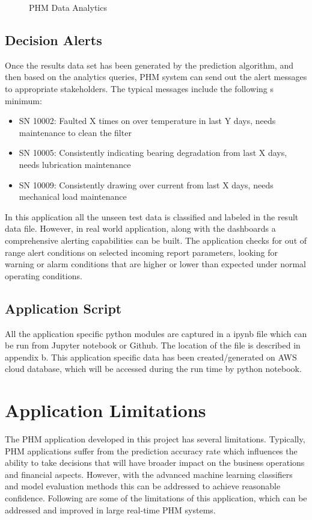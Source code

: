 \documentclass[sigconf]{acmart}
\begin{document}
\begin{figure}
\caption{PHM Data Analytics} \label{fig:Figure4}
\end{figure}

\subsection{Decision Alerts}
Once the results data set has been generated by the prediction algorithm, and then based on the analytics queries, PHM system can send out the alert messages to appropriate stakeholders. The typical messages include the following s minimum:
\begin{itemize}
  \item SN 10002: Faulted X times on over temperature in last Y days, needs maintenance to clean the filter
  \item SN 10005: Consistently indicating bearing degradation from last X days, needs lubrication maintenance
\item SN 10009: Consistently drawing over current from last X days, needs mechanical load maintenance
\end{itemize}

In this application all the unseen test data is classified and labeled in the result data file. However, in real world application, along with the dashboards a comprehensive alerting capabilities can be built. The application checks for out of range alert conditions on selected incoming report parameters, looking for warning or alarm conditions that are higher or lower than expected under normal operating conditions.

\subsection{Application Script}
All the application specific python modules are captured in a ipynb file which can be run from Jupyter notebook or Github. The location of the file is described in appendix b. This application specific data has been created/generated on AWS cloud database, which will be accessed during the run time by python notebook.
\section{Application Limitations}
The PHM application developed in this project has several limitations. Typically, PHM applications suffer from the prediction accuracy rate which influences the ability to take decisions that will have broader impact on the business operations and financial aspects. However, with the advanced machine learning classifiers and model evaluation methods this can be addressed to achieve reasonable confidence. Following are some of the limitations of this application, which can be addressed and improved in large real-time PHM systems.
\end{document}
